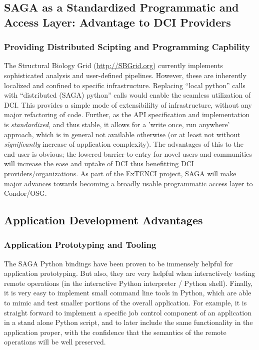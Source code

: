 \documentclass[12pt]{article}
\newcommand{\I}[1]{\textit{#1}}
\begin{document}
\subsection{SAGA as a Standardized Programmatic and Access Layer:
  Advantage to DCI Providers}

\subsubsection*{Providing Distributed Scipting and Programming Capbility}
The Structural Biology Grid (\url{http://SBGrid.org}) currently
implements sophisticated analysis and user-defined pipelines. However,
these are inherently localized and confined to specific
infrastructure.  Replacing ``local python'' calls with ``distributed
(SAGA) python'' calls would enable the seamless utilization of
DCI. This provides a simple mode of extensibililty of infrastructure,
without any major refactoring of code. Further, as the API
specification and implementation is \I{standardized}, and thus stable,
it allows for a 'write once, run anywhere' approach, which is in
general not available otherwise (or at least not without
\I{significantly} increase of application complexity).  The advantages
of this to the end-user is obvious; the lowered barrier-to-entry for
novel users and communities will increase the ease and uptake of DCI
thus benefitting DCI providers/organizations.  As part of the ExTENCI
project, SAGA will make major advances towards becoming a broadly
usable programmatic access layer to Condor/OSG.

\subsection{Application Development Advantages}

\subsubsection*{Application Prototyping and Tooling}

The SAGA Python bindings have been proven to be immensely helpful for
application prototyping.  But also, they are very helpful when
interactively testing remote operations (in the interactive Python
interpreter / Python shell).  Finally, it is very easy to implement
small command line tools in Python, which are able to mimic and test
smaller portions of the overall application.  For example, it is
straight forward to implement a specific job control component of an
application in a stand alone Python script, and to later include the
same functionality in the application proper, with the confidence that
the semantics of the remote operations will be well
preserved. %
\end{document}
